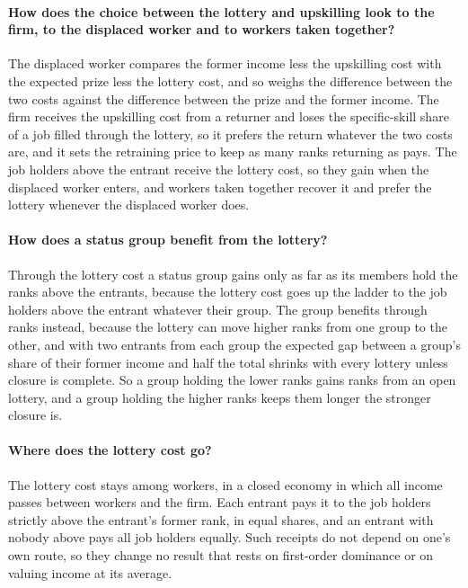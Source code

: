 \documentclass[10pt]{article}
\begin{document}
\paragraph{How does the choice between the lottery and upskilling look to the firm, to the displaced worker and to workers taken together?} The displaced worker compares the former income less the upskilling cost with the expected prize less the lottery cost, and so weighs the difference between the two costs against the difference between the prize and the former income. The firm receives the upskilling cost from a returner and loses the specific-skill share of a job filled through the lottery, so it prefers the return whatever the two costs are, and it sets the retraining price to keep as many ranks returning as pays. The job holders above the entrant receive the lottery cost, so they gain when the displaced worker enters, and workers taken together recover it and prefer the lottery whenever the displaced worker does.

\paragraph{How does a status group benefit from the lottery?} Through the lottery cost a status group gains only as far as its members hold the ranks above the entrants, because the lottery cost goes up the ladder to the job holders above the entrant whatever their group. The group benefits through ranks instead, because the lottery can move higher ranks from one group to the other, and with two entrants from each group the expected gap between a group's share of their former income and half the total shrinks with every lottery unless closure is complete. So a group holding the lower ranks gains ranks from an open lottery, and a group holding the higher ranks keeps them longer the stronger closure is.

\paragraph{Where does the lottery cost go?} The lottery cost stays among workers, in a closed economy in which all income passes between workers and the firm. Each entrant pays it to the job holders strictly above the entrant's former rank, in equal shares, and an entrant with nobody above pays all job holders equally. Such receipts do not depend on one's own route, so they change no result that rests on first-order dominance or on valuing income at its average.
\end{document}
